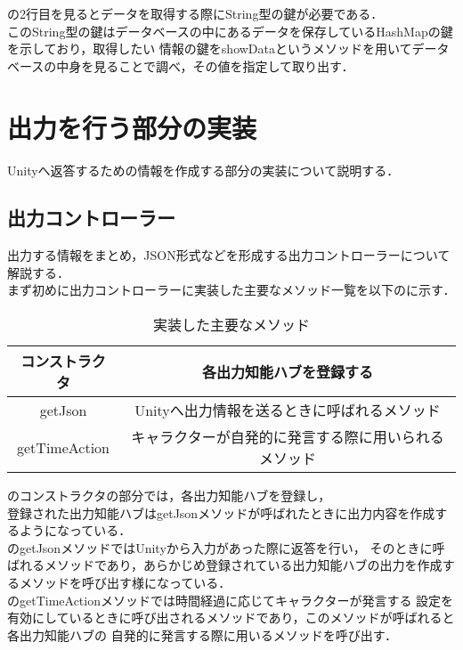 の2行目を見るとデータを取得する際にString型の鍵が必要である．
\\
このString型の鍵はデータベースの中にあるデータを保存しているHashMapの鍵を示しており，取得したい
情報の鍵をshowDataというメソッドを用いてデータベースの中身を見ることで調べ，その値を指定して取り出す．


\section{出力を行う部分の実装}
Unityへ返答するための情報を作成する部分の実装について説明する．
\\
\subsection{出力コントローラー}
出力する情報をまとめ，JSON形式などを形成する出力コントローラーについて解説する．\\
まず初めに出力コントローラーに実装した主要なメソッド一覧を以下のに示す．\\

\begin{table}[tbh]
	\caption{実装した主要なメソッド} \label{tab:OutputController}
	\begin{center}
		\begin{tabular}[htb]{c|c}
		\hline
		コンストラクタ & 各出力知能ハブを登録する \\
		\hline
		getJson & Unityへ出力情報を送るときに呼ばれるメソッド \\
		\hline
		getTimeAction & キャラクターが自発的に発言する際に用いられるメソッド \\
		\hline
		\end{tabular}
	\end{center}
\end{table}

のコンストラクタの部分では，各出力知能ハブを登録し，
\\
登録された出力知能ハブはgetJsonメソッドが呼ばれたときに出力内容を作成するようになっている．
\\
のgetJsonメソッドではUnityから入力があった際に返答を行い，
そのときに呼ばれるメソッドであり，あらかじめ登録されている出力知能ハブの出力を作成するメソッドを呼び出す様になっている．
\\
のgetTimeActionメソッドでは時間経過に応じてキャラクターが発言する
設定を有効にしているときに呼び出されるメソッドであり，このメソッドが呼ばれると各出力知能ハブの
自発的に発言する際に用いるメソッドを呼び出す．
\\

